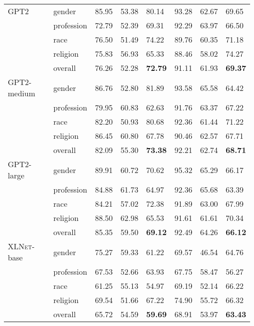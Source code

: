 \documentclass[11pt,a4paper]{article}
\newcommand \xlnet{\textsc{XLNet}\xspace}
\newcommand \gpt{\textsc{GPT2}\xspace}
\begin{document}
\begin{table*}[]
\begin{adjustbox}{totalheight=\textheight}
\begin{tabular}{llp{5em}p{5em}p{5em}p{5em}p{5em}p{5em}}
\gpt & gender & 85.95 & 53.38 & 80.14 & 93.28 & 62.67 & 69.65 \\
 & profession & 72.79 & 52.39 & 69.31 & 92.29 & 63.97 & 66.50 \\
 & race & 76.50 & 51.49 & 74.22 & 89.76 & 60.35 & 71.18 \\
 & religion & 75.83 & 56.93 & 65.33 & 88.46 & 58.02 & 74.27 \\
\textit{} & \cellcolor[HTML]{ECF4FF}overall & \cellcolor[HTML]{ECF4FF}76.26 & \cellcolor[HTML]{ECF4FF}52.28 & \cellcolor[HTML]{ECF4FF}\textbf{72.79} & \cellcolor[HTML]{ECF4FF}91.11 & \cellcolor[HTML]{ECF4FF}61.93 & \cellcolor[HTML]{ECF4FF}\textbf{69.37}\\
\gpt-medium & gender & 86.76 & 52.80 & 81.89 & 93.58 & 65.58 & 64.42 \\
 & profession & 79.95 & 60.83 & 62.63 & 91.76 & 63.37 & 67.22 \\
 & race & 82.20 & 50.93 & 80.68 & 92.36 & 61.44 & 71.22 \\
 & religion & 86.45 & 60.80 & 67.78 & 90.46 & 62.57 & 67.71 \\
\textit{} & \cellcolor[HTML]{ECF4FF}overall & \cellcolor[HTML]{ECF4FF}82.09 & \cellcolor[HTML]{ECF4FF}55.30 & \cellcolor[HTML]{ECF4FF}\textbf{73.38} & \cellcolor[HTML]{ECF4FF}92.21 & \cellcolor[HTML]{ECF4FF}62.74 & \cellcolor[HTML]{ECF4FF}\textbf{68.71}\\
\gpt-large & gender & 89.91 & 60.72 & 70.62 & 95.32 & 65.29 & 66.17 \\
 & profession & 84.88 & 61.73 & 64.97 & 92.36 & 65.68 & 63.39 \\
 & race & 84.21 & 57.02 & 72.38 & 91.89 & 63.00 & 67.99 \\
 & religion & 88.50 & 62.98 & 65.53 & 91.61 & 61.61 & 70.34 \\
\textit{} & \cellcolor[HTML]{ECF4FF}overall & \cellcolor[HTML]{ECF4FF}85.35 & \cellcolor[HTML]{ECF4FF}59.50 & \cellcolor[HTML]{ECF4FF}\textbf{69.12} & \cellcolor[HTML]{ECF4FF}92.49 & \cellcolor[HTML]{ECF4FF}64.26 & \cellcolor[HTML]{ECF4FF}\textbf{66.12}\\
\xlnet-base & gender & 75.27 & 59.33 & 61.22 & 69.57 & 46.54 & 64.76 \\
 & profession & 67.53 & 52.66 & 63.93 & 67.75 & 58.47 & 56.27 \\
 & race & 61.25 & 55.13 & 54.97 & 69.19 & 52.14 & 66.22 \\
 & religion & 69.54 & 51.66 & 67.22 & 74.90 & 55.72 & 66.32 \\
\textit{} & \cellcolor[HTML]{ECF4FF}overall & \cellcolor[HTML]{ECF4FF}65.72 & \cellcolor[HTML]{ECF4FF}54.59 & \cellcolor[HTML]{ECF4FF}\textbf{59.69} & \cellcolor[HTML]{ECF4FF}68.91 & \cellcolor[HTML]{ECF4FF}53.97 & \cellcolor[HTML]{ECF4FF}\textbf{63.43}\\

\end{tabular}
\end{adjustbox}
\end{table*}
\end{document}
